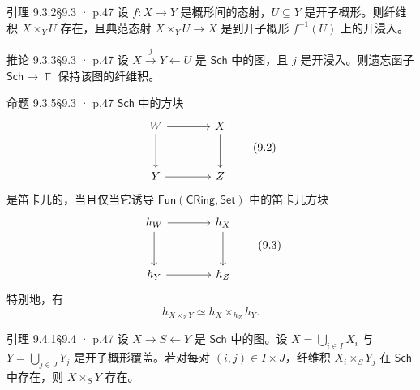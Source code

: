 \documentclass[UTF8,10pt,fontset=windows]{ctexart}
\newcommand{\CRing}{\mathsf{CRing}}\newcommand{\Ring}{\mathsf{Ring}}
\newcommand{\Set}{\mathsf{Set}}\newcommand{\Ab}{\mathsf{Ab}}
\newcommand{\Sch}{\mathsf{Sch}}\newcommand{\PShv}{\mathsf{PShv}}
\begin{document}
\begin{card}{引理 9.3.2}{§9.3 · p.47}
设 $f \colon X \to Y$ 是概形间的态射，$U \subseteq Y$ 是开子概形。则纤维积 $X \times_Y U$ 存在，且典范态射 $X \times_Y U \to X$ 是到开子概形 $f^{-1}(U)$ 上的开浸入。
\end{card}
\begin{card}{推论 9.3.3}{§9.3 · p.47}
设 $X \xrightarrow{j} Y \leftarrow U$ 是 $\Sch$ 中的图，且 $j$ 是开浸入。则遗忘函子 $\Sch \to \Top$ 保持该图的纤维积。
\end{card}
\begin{card}{命题 9.3.5}{§9.3 · p.47}
$\Sch$ 中的方块
\[
\begin{tikzcd}[column sep=3.8em,row sep=3em]
W \arrow[r] \arrow[d] & X \arrow[d]\\
Y \arrow[r] & Z
\end{tikzcd}
\tag{9.2}
\]
是笛卡儿的，当且仅当它诱导 $\mathsf{Fun}(\CRing,\Set)$ 中的笛卡儿方块
\[
\begin{tikzcd}[column sep=3.8em,row sep=3em]
h_W \arrow[r] \arrow[d] & h_X \arrow[d]\\
h_Y \arrow[r] & h_Z
\end{tikzcd}
\tag{9.3}
\]
特别地，有
\[
h_{X \times_Z Y} \simeq h_X \times_{h_Z} h_Y .
\tag{9.4}
\]
\end{card}
\begin{card}{引理 9.4.1}{§9.4 · p.47}
设 $X \to S \leftarrow Y$ 是 $\Sch$ 中的图。设 $X = \bigcup_{i \in I} X_i$ 与 $Y = \bigcup_{j \in J} Y_j$ 是开子概形覆盖。若对每对 $(i,j) \in I \times J$，纤维积 $X_i \times_S Y_j$ 在 $\Sch$ 中存在，则 $X \times_S Y$ 存在。
\end{card}
\end{document}
